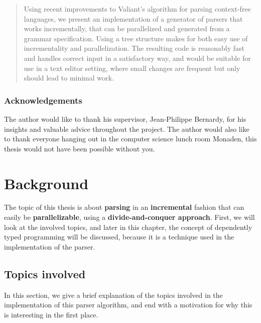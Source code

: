 \documentclass[a4paper,12pt,notitlepage]{report}
\begin{document}


\begin{abstract}
\thispagestyle{plain}
\setcounter{page}{3} %
Using recent improvements to Valiant's algorithm for parsing context-free
languages, we present an implementation of a generator of parsers that works
incrementally, that can be parallelized and generated from a grammar
specification. Using a tree structure makes for both easy use of incrementality
and parallelization.  The resulting code is reasonably fast and handles correct
input in a satisfactory way, and would be suitable for use in a text editor
setting, where small changes are frequent but only should lead to minimal work.
\end{abstract}
\newpage

\thispagestyle{plain}
\subsection*{Acknowledgements}
The author would like to thank his supervisor, Jean-Philippe Bernardy, for his
insights and valuable advice throughout the project. The author would also like
to thank everyone hanging out in the computer science lunch room Monaden, this
thesis would not have been possible without you. 

\newpage
{}
\tableofcontents

%
%

\chapter{Background}
The topic of this thesis is about \textbf{parsing} in an \textbf{incremental}
fashion that can easily be \textbf{parallelizable}, using a
\textbf{divide-and-conquer approach}. First, we will look at the involved
topics, and later in this chapter, the concept of dependently typed programming
will be discussed, because it is a technique used in the implementation of the
parser.

\section{Topics involved}
In this section, we give a brief explanation of the topics involved in the
implementation of this parser algorithm, and end with a motivation for why this
is interesting in the first place. 
\end{document}
